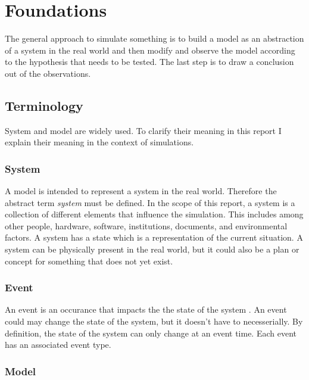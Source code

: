 
\section{Foundations}

The general approach to simulate something is to build a model as an abstraction of a system in the real world and then modify and observe the model according to the hypothesis that needs to be tested. The last step is to draw a conclusion out of the observations.

\subsection{Terminology}

System and model are widely used. To clarify their meaning in this report I explain their meaning in the context of simulations.

\subsubsection{System}

A model is intended to represent a system in the real world. Therefore the abstract term \textit{system} must be defined. In the scope of this report, a system is a collection of different elements that influence the simulation. This includes among other people, hardware, software, institutions, documents, and environmental factors. A system has a state which is a representation of the current situation. A system can be physically present in the real world, but it could also be a plan or concept for something that does not yet exist.

\subsubsection{Event}
An event is an occurance that impacts the the state of the system \cite[page 187]{leemis2006discrete}. An event could may change the state of the system, but it doesn't have to necesserially. 
By definition, the state of the system can only change at an event time. Each event has an associated event type.

\subsubsection{Model}

